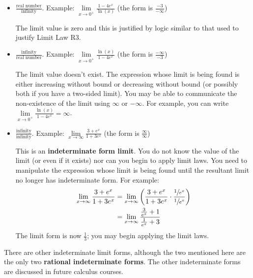 \documentclass[10pt,oneside,]{book}
\newcommand{\terminology}[1]{\textbf{#1}}
\theoremstyle{plain}
\theoremstyle{definition}
\numberwithin{equation}{section}
\newcommand{\fe}[2]{#1\mathopen{}\left(#2\right)\mathclose{}}
\begin{document}
\begin{itemize}[label=\textbullet]
\item{}\(\frac{\text{real number}}{\text{infinity}}\). Example: \(\lim\limits_{x\to0^{+}}\frac{1-4e^{x}}{\fe{\ln}{x}}\) (the form is \(\frac{-3}{-\infty}\))%

                \par
The limit value is zero and this is justified by logic similar to that used to justify Limit Law R3.%
\end{itemize}
\begin{itemize}[label=\textbullet]
\item{}\(\frac{\text{infinity}}{\text{real number}}\). Example: \(\lim\limits_{x\to0^{+}}\frac{\fe{\ln}{x}}{1-4e^{x}}\) (the form is \(\frac{-\infty}{-3}\))%

                \par
The limit value doesn't exist.  The expression whose limit is being found is either increasing without bound or decreasing without bound (or possibly both if you have a two-sided limit).   You may be able to communicate the non-existence of the limit using \(\infty\) or \(-\infty\). For example, you can write \(\lim\limits_{x\to0^{+}}\frac{\fe{\ln}{x}}{1-4e^{x}}=\infty\).%
\end{itemize}
\begin{itemize}[label=\textbullet]
\item{}\(\frac{\text{infinity}}{\text{infinity}}\). Example: \(\lim\limits_{x\to\infty}\frac{3+e^x}{1+3e^x}\) (the form is \(\frac{\infty}{\infty}\))%

                \par
This is an \terminology{indeterminate form limit}. You do not know the value of the limit (or even if it exists) nor can you begin to apply limit laws.  You need to manipulate the expression whose limit is being found until the resultant limit no longer has indeterminate form.  For example:\begin{align*}
\lim_{x\to\infty}\frac{3+e^x}{1+3e^x}&=\lim_{x\to\infty}\left(\frac{3+e^x}{1+3e^x}\cdot\frac{\sfrac{1}{e^x}}{\sfrac{1}{e^x}}\right)\\
&=\lim_{x\to\infty}\frac{\frac{3}{e^x}+1}{\frac{1}{e^x}+3}
\end{align*}The limit form is now \(\frac{1}{3}\); you may begin applying the limit laws.%
\end{itemize}
There are other indeterminate limit forms, although the two mentioned here are the only two \terminology{rational indeterminate forms}.  The other indeterminate forms are discussed in future calculus courses.%
\typeout{************************************************}
\typeout{************************************************}
\end{document}
